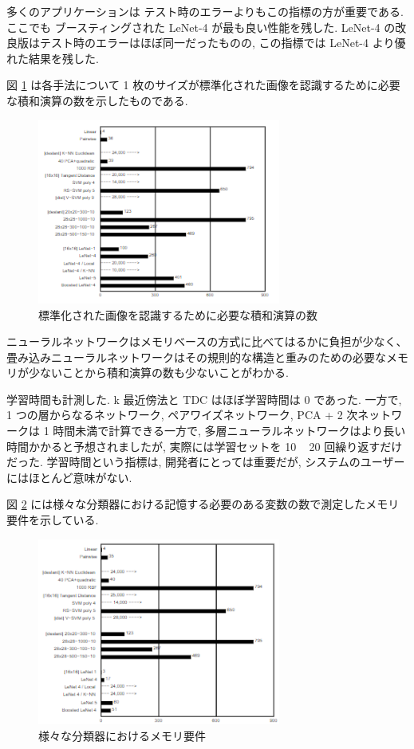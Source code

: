 \documentclass[twocolumn]{jarticle}     %
\begin{document}
多くのアプリケーションは テスト時のエラーよりもこの指標の方が重要である. ここでも ブースティングされた LeNet-4 が最も良い性能を残した. LeNet-4 の改良版はテスト時のエラーはほぼ同一だったものの, この指標では LeNet-4 より優れた結果を残した.
\par
図 \ref{fig:11} は各手法について 1 枚のサイズが標準化された画像を認識するために必要な積和演算の数を示したものである. 
\begin{figure}[t]
  \centering
  \includegraphics[width=80mm]{assets/11.png}
  \caption{標準化された画像を認識するために必要な積和演算の数}
  \label{fig:11}
\end{figure}
ニューラルネットワークはメモリベースの方式に比べてはるかに負担が少なく、畳み込みニューラルネットワークはその規則的な構造と重みのための必要なメモリが少ないことから積和演算の数も少ないことがわかる. 
\par
学習時間も計測した. k 最近傍法と TDC はほぼ学習時間は 0 であった.
一方で, 1 つの層からなるネットワーク, ペアワイズネットワーク, PCA + 2 次ネットワークは 1 時間未満で計算できる一方で, 多層ニューラルネットワークはより長い時間かかると予想されましたが, 実際には学習セットを 10 ~ 20 回繰り返すだけだった.
学習時間という指標は, 開発者にとっては重要だが, システムのユーザーにはほとんど意味がない.
\par
図 \ref{fig:12} には様々な分類器における記憶する必要のある変数の数で測定したメモリ要件を示している.
\begin{figure}[t]
  \centering
  \includegraphics[width=80mm]{assets/12.png}
  \caption{様々な分類器におけるメモリ要件}
  \label{fig:12}
\end{figure}
\end{document}
